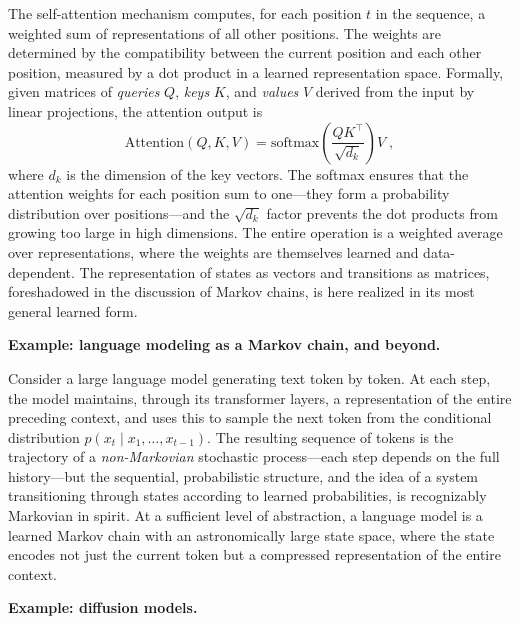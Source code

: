 \medskip

The self-attention mechanism computes, for each position $t$ in the sequence, a weighted sum of representations of all other positions. The weights are determined by the compatibility between the current position and each other position, measured by a dot product in a learned representation space. Formally, given matrices of \textit{queries} $Q$, \textit{keys} $K$, and \textit{values} $V$ derived from the input by linear projections, the attention output is
\begin{equation}
    \text{Attention}(Q, K, V) = \text{softmax}\!\left(\frac{QK^\top}{\sqrt{d_k}}\right) V \; ,
\end{equation}
where $d_k$ is the dimension of the key vectors. The softmax ensures that the attention weights for each position sum to one---they form a probability distribution over positions---and the $\sqrt{d_k}$ factor prevents the dot products from growing too large in high dimensions. The entire operation is a weighted average over representations, where the weights are themselves learned and data-dependent. The representation of states as vectors and transitions as matrices, foreshadowed in the discussion of Markov chains, is here realized in its most general learned form.

\medskip

\textbf{Example: language modeling as a Markov chain, and beyond.}

\medskip

Consider a large language model generating text token by token. At each step, the model maintains, through its transformer layers, a representation of the entire preceding context, and uses this to sample the next token from the conditional distribution $p(x_t \mid x_1, \dots, x_{t-1})$. The resulting sequence of tokens is the trajectory of a \textit{non-Markovian} stochastic process---each step depends on the full history---but the sequential, probabilistic structure, and the idea of a system transitioning through states according to learned probabilities, is recognizably Markovian in spirit. At a sufficient level of abstraction, a language model is a learned Markov chain with an astronomically large state space, where the state encodes not just the current token but a compressed representation of the entire context.

\medskip

\textbf{Example: diffusion models.}

\medskip

